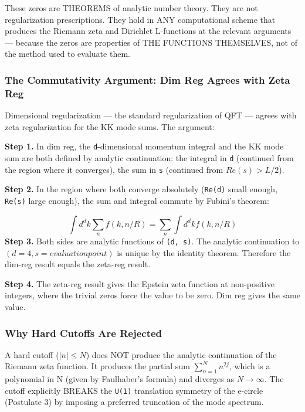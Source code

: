 \documentclass[aps,prd,preprint,superscriptaddress,longbibliography,floatfix]{revtex4-2}
\theoremstyle{remark}
\begin{document}
These zeros are THEOREMS of analytic number theory. They are not regularization prescriptions. They hold in ANY computational scheme that produces the Riemann zeta and Dirichlet L-functions at the relevant arguments --- because the zeros are properties of THE FUNCTIONS THEMSELVES, not of the method used to evaluate them.


\subsubsection{The Commutativity Argument: Dim Reg Agrees with Zeta Reg}

Dimensional regularization --- the standard regularization of QFT --- agrees with zeta regularization for the KK mode sums. The argument:

\textbf{Step 1.} In dim reg, the \texttt{d}-dimensional momentum integral and the KK mode sum are both defined by analytic continuation: the integral in \texttt{d} (continued from the region where it converges), the sum in \texttt{s} (continued from $Re(s) > L/2$).

\textbf{Step 2.} In the region where both converge absolutely (\texttt{Re(d)} small enough, \texttt{Re(s)} large enough), the sum and integral commute by Fubini's theorem:


\begin{equation}
    \int d^d k \sum_n f(k, n/R) = \sum_n \int d^d k f(k, n/R)
\end{equation}
\textbf{Step 3.} Both sides are analytic functions of \texttt{(d, s)}. The analytic continuation to $(d = 4, s = evaluation point)$ is unique by the identity theorem. Therefore the dim-reg result equals the zeta-reg result.

\textbf{Step 4.} The zeta-reg result gives the Epstein zeta function at non-positive integers, where the trivial zeros force the value to be zero. Dim reg gives the same value.


\subsubsection{Why Hard Cutoffs Are Rejected}

A hard cutoff ($|n| \leq N$) does NOT produce the analytic continuation of the Riemann zeta function. It produces the partial sum $\sum_{n=1}^N n^{2j}$, which is a polynomial in N (given by Faulhaber's formula) and diverges as $N \to \infty$. The cutoff explicitly BREAKS the \texttt{U(1)} translation symmetry of the e-circle (Postulate 3) by imposing a preferred truncation of the mode spectrum.
\end{document}
